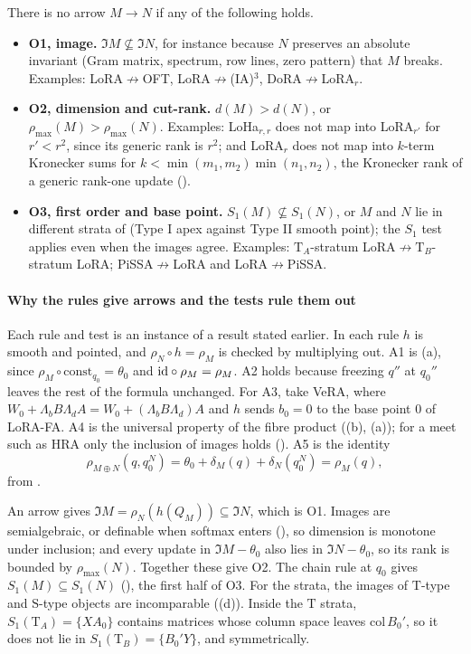 There is no arrow $M\to N$ if any of the following holds.
\begin{itemize}
  \item \textbf{O1, image.} $\Im M\not\subseteq\Im N$, for instance because $N$ preserves an absolute invariant (Gram
  matrix, spectrum, row lines, zero pattern) that $M$ breaks. Examples: LoRA${}\not\to{}$OFT, LoRA${}\not\to{}$(IA)$^3$,
  DoRA${}\not\to{}$LoRA$_r$.
  \item \textbf{O2, dimension and cut-rank.} $d(M)>d(N)$, or $\rho_{\max}(M)>\rho_{\max}(N)$. Examples:
  LoHa$_{r,r}$ does not map into LoRA$_{r'}$ for $r'<r^2$, since its generic rank is $r^2$; and LoRA$_r$ does not map
  into $k$-term Kronecker sums for $k<\min(m_1,m_2)\min(n_1,n_2)$, the Kronecker rank of a generic rank-one update
  ().
  \item \textbf{O3, first order and base point.} $S_1(M)\not\subseteq S_1(N)$, or $M$ and $N$ lie in different strata
  of  (Type I apex against Type II smooth point); the $S_1$ test applies even when the images
  agree. Examples: $\mathrm T_A$-stratum LoRA${}\not\to{}\mathrm T_B$-stratum LoRA; PiSSA${}\not\to{}$LoRA and
  LoRA${}\not\to{}$PiSSA.
\end{itemize}

\paragraph{Why the rules give arrows and the tests rule them out}
Each rule and test is an instance of a result stated earlier. In each rule $h$ is smooth and pointed, and
$\rho_N\circ h=\rho_M$ is checked by multiplying out. A1 is (a), since
$\rho_M\circ\mathrm{const}_{q_0}=\theta_0$ and $\mathrm{id}\circ\rho_M=\rho_M$. A2 holds because freezing $q''$ at $q_0''$
leaves the rest of the formula unchanged. For A3, take VeRA, where $W_0+\Lambda_bB\Lambda_dA=W_0+(\Lambda_bB\Lambda_d)A$
and $h$ sends $b_0=0$ to the base point $0$ of LoRA-FA. A4 is the universal property of the fibre product
((b), (a)); for a meet such as HRA only the inclusion of images holds
(). A5 is the identity
\begin{equation}\label{eq:atlas-sum}
  \rho_{M\oplus N}(q,q_0^N)=\theta_0+\delta_M(q)+\delta_N(q_0^N)=\rho_M(q),
\end{equation}
from .

An arrow gives $\Im M=\rho_N(h(Q_M))\subseteq\Im N$, which is O1. Images are semialgebraic, or definable when softmax
enters (), so dimension is monotone under inclusion; and every update in $\Im M-\theta_0$ also lies in
$\Im N-\theta_0$, so its rank is bounded by $\rho_{\max}(N)$. Together these give O2. The chain rule at $q_0$ gives
$S_1(M)\subseteq S_1(N)$ (), the first half of O3. For the strata, the images of $\mathrm T$-type
and $\mathrm S$-type objects are incomparable ((d)). Inside the $\mathrm T$ strata,
$S_1(\mathrm T_A)=\{XA_0\}$ contains matrices whose column space leaves $\mathrm{col}\,B_0'$, so it does not lie in
$S_1(\mathrm T_B)=\{B_0'Y\}$, and symmetrically.


